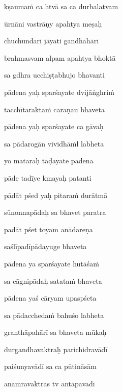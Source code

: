 \nemslokad 
kṣaumaṁ ca htvā sa ca durbalatvam \veg\dontdisplaylinenum

\ujvers\nemsloka 
ūrnāni vastrāṇy apahtya meṣaḥ
\dontdisplaylinenum

\nemslokab 
chuchundarī jāyati gandhahārī \danda\dontdisplaylinenum

\nemslokac 
brahmasvam alpam apahtya bhoktā
\dontdisplaylinenum

\nemslokad 
sa gdhra ucchiṣṭabhujo bhavanti \veg\dontdisplaylinenum

\ujvers\nemsloka 
pādena yaḥ sparśayate dvijāṅghriṁ
\dontdisplaylinenum

\nemslokab 
tacchītaraktaṁ caraṇau bhaveta \danda\dontdisplaylinenum

\nemslokac 
pādena yaḥ sparśayate ca gāvaḥ
\dontdisplaylinenum

\nemslokad 
sa pādarogān vividhāṁl labheta \veg\dontdisplaylinenum

\ujvers\nemsloka 
yo mātaraḥ tāḍayate pādena
\dontdisplaylinenum

\nemslokab 
pāde tadīye kmayaḥ patanti \danda\dontdisplaylinenum

\nemslokac 
pādāt pśed yaḥ pitaraṁ durātmā
\dontdisplaylinenum

\nemslokad 
sūnonnapādaḥ sa bhavet paratra \veg\dontdisplaylinenum

\ujvers\nemsloka 
padāt pśet toyam anādareṇa
\dontdisplaylinenum

\nemslokab 
saślīpadīpādayuge bhaveta \danda\dontdisplaylinenum

\nemslokac 
pādena ya sparśayate hutāśaṁ
\dontdisplaylinenum

\nemslokad 
sa cāgnipādaḥ satataṁ bhaveta \veg\dontdisplaylinenum

\ujvers\nemsloka 
pādena yaś cāryam upaspśeta
\dontdisplaylinenum

\nemslokab 
sa pādacchedaṁ bahuśo labheta \danda\dontdisplaylinenum

\nemslokac 
granthāpahārī sa bhaveta mūkaḥ
\dontdisplaylinenum

\nemslokad 
durgandhavaktraḥ parichidravādī \veg\dontdisplaylinenum

\ujvers\nemsloka 
paiśunyavādī sa ca pūtināsām
\dontdisplaylinenum

\nemslokab 
anamravaktras tv antāpavādī \danda\dontdisplaylinenum

